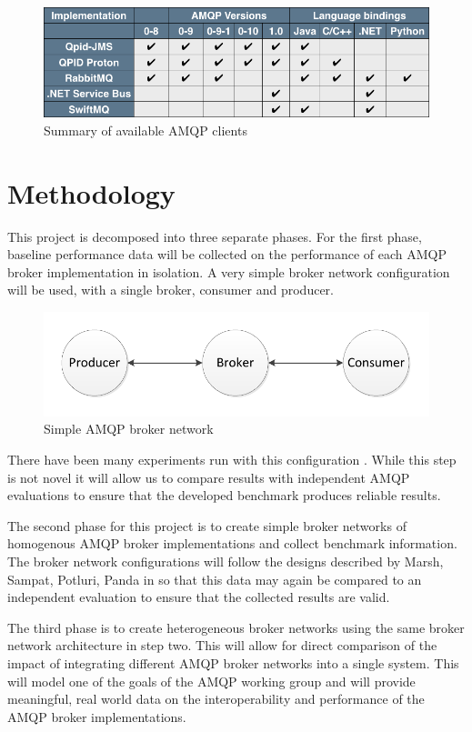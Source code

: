 \documentclass{thesis}
\begin{document}
\begin{figure}[h]
\centering
\includegraphics[scale=.5]{client_comparision}  
\caption{Summary of available AMQP clients}
\end{figure}

\chapter{Methodology}
This project is decomposed into three separate phases.  For the first phase, baseline performance data will be collected on the performance of each AMQP broker implementation in isolation.  A very simple broker network configuration will be used, with a single broker, consumer and producer.

\begin{figure}[h]
\centering
\includegraphics[scale=.75]{direct_connect}  
\caption{Simple AMQP broker network}
\end{figure}

There have been many experiments run with this configuration \cite{Chirino} \cite{Bayer}.  While this step is not novel it will allow us to compare results with independent AMQP evaluations to ensure that the developed benchmark produces reliable results. 

The second phase for this project is to create simple broker networks of homogenous AMQP broker implementations and collect benchmark information.  The broker network configurations will follow the designs described by Marsh, Sampat, Potluri, Panda in \cite{marsh2010scaling} so that this data may again be compared to an independent evaluation to ensure that the collected results are valid.

The third phase is to create heterogeneous broker networks using the same broker network architecture in step two.  This will allow for direct comparison of the impact of integrating different AMQP broker networks into a single system.  This will model one of the goals of the AMQP working group and will provide meaningful, real world data on the interoperability and performance of the AMQP broker implementations. 
\end{document}
